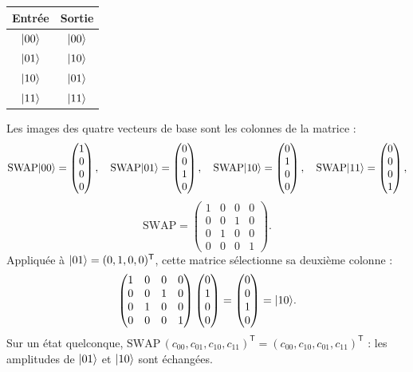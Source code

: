 \begin{center}
\renewcommand{\arraystretch}{1.3}
\begin{tabular}{@{}cc@{}}
\toprule
Entrée & Sortie \\
\midrule
$|00\rangle$ & $|00\rangle$ \\
$|01\rangle$ & $|10\rangle$ \\
$|10\rangle$ & $|01\rangle$ \\
$|11\rangle$ & $|11\rangle$ \\
\bottomrule
\end{tabular}
\end{center}

Les images des quatre vecteurs de base sont les colonnes de la matrice :
\[
  \mathrm{SWAP}|00\rangle=\begin{pmatrix}1\\0\\0\\0\end{pmatrix},\quad
  \mathrm{SWAP}|01\rangle=\begin{pmatrix}0\\0\\1\\0\end{pmatrix},\quad
  \mathrm{SWAP}|10\rangle=\begin{pmatrix}0\\1\\0\\0\end{pmatrix},\quad
  \mathrm{SWAP}|11\rangle=\begin{pmatrix}0\\0\\0\\1\end{pmatrix},
\]
\[
  \mathrm{SWAP}=\begin{pmatrix}
    1 & 0 & 0 & 0\\ 0 & 0 & 1 & 0\\ 0 & 1 & 0 & 0\\ 0 & 0 & 0 & 1
  \end{pmatrix}.
\]
Appliquée à $|01\rangle=(0,1,0,0)^{\mathsf T}$, cette matrice sélectionne sa deuxième colonne :
\[
  \begin{pmatrix}
    1 & 0 & 0 & 0\\ 0 & 0 & 1 & 0\\ 0 & 1 & 0 & 0\\ 0 & 0 & 0 & 1
  \end{pmatrix}
  \begin{pmatrix}0\\1\\0\\0\end{pmatrix}
  =\begin{pmatrix}0\\0\\1\\0\end{pmatrix}=|10\rangle.
\]
Sur un état quelconque, $\mathrm{SWAP}\,(c_{00},c_{01},c_{10},c_{11})^{\mathsf T}
=(c_{00},c_{10},c_{01},c_{11})^{\mathsf T}$ : les amplitudes de $|01\rangle$ et $|10\rangle$
sont échangées.

